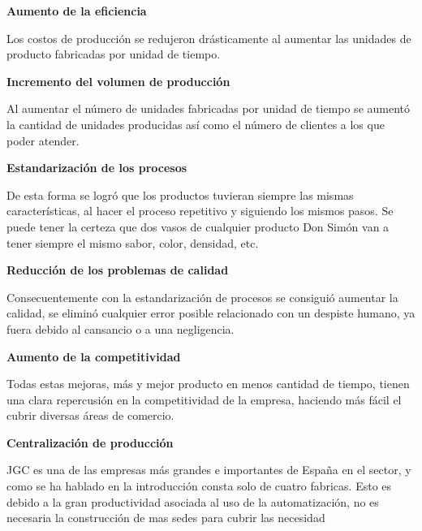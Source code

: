 \documentclass[11pt,a4paper,spanish,twoside]{report}
\begin{document}
\begin{description}
\item \textbf{Aumento de la eficiencia}

Los costos de producción se redujeron drásticamente al aumentar las
unidades de producto fabricadas por unidad de tiempo. 

\item \textbf{Incremento del volumen de producción}

Al aumentar el número de unidades fabricadas por unidad de tiempo se aumentó
la cantidad de unidades producidas así como el número de clientes a los que
poder atender.

\item \textbf{Estandarización de los procesos}

De esta forma se logró que los productos tuvieran siempre las mismas
características, al hacer el proceso repetitivo y siguiendo los mismos
pasos. Se puede tener la certeza que dos vasos de cualquier producto Don
Simón van a tener siempre el mismo sabor, color, densidad, etc.

\item \textbf{Reducción de los problemas de calidad}

Consecuentemente con la estandarización de procesos se consiguió aumentar la
calidad, se eliminó cualquier error posible relacionado con un despiste
humano, ya fuera debido al cansancio o a una negligencia. 

\item \textbf{Aumento de la competitividad}

Todas estas mejoras, más y mejor producto en menos cantidad de
tiempo, tienen una clara repercusión en la competitividad de la empresa,
haciendo más fácil el cubrir diversas áreas de comercio. 

\item \textbf{Centralización de producción}

JGC es una de las empresas más grandes e importantes de España en el sector,
y como se ha hablado en la introducción consta solo de cuatro fabricas. Esto
es debido a la gran productividad asociada al uso de la automatización, no es
necesaria la construcción de mas sedes para cubrir las necesidad

\end{description}
\end{document}
